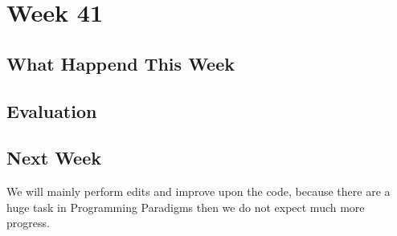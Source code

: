\section*{Week 41}
\subsection*{What Happend This Week}


\subsection*{Evaluation}


\subsection*{Next Week}
We will mainly perform edits and improve upon the code, because there are a huge
task in Programming Paradigms then we do not expect much more progress.



% 
% 
% 
